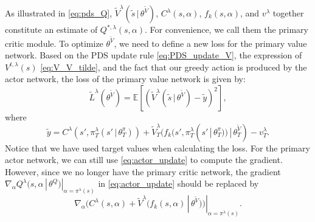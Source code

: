 \documentclass[lettersize, journal]{IEEEtran}
\begin{document}
As illustrated in \eqref{eq:pds_Q},
$\tilde{V}^{\lambda}(\tilde{s} \, | \, \theta^{\tilde{V}})$, $C^{\lambda}(s,\alpha)$, 
$f_k(s,\alpha)$, and $v^{\lambda}$ together constitute an estimate of $Q^{*,\lambda}(s,\alpha)$.
For convenience, we call them the primary critic module.
To optimize $\theta^{\tilde{V}}$, we need to define a new loss for the primary value network.
Based on the PDS update rule \eqref{eq:PDS_update_V}, the expression of $V^{t,\lambda}(s)$ \eqref{eq:V_V_tilde},
and the fact that our greedy action is produced by the actor network, the loss of the primary value network
is given by:
\begin{equation}
    \tilde{L}^{\lambda}(\theta^{\tilde{V}}) = \mathbb{E} \left[ \left( \tilde{V}^{\lambda}(\tilde{s} \, | \, \theta^{\tilde{V}})
    - \tilde{y} \right)^2\right],
    \label{eq:new_loss}
\end{equation}
where
\begin{equation*}
    \tilde{y} = C^{\lambda}(s', \pi^{\lambda}_T(s' \, | \, \theta^{\pi}_T)) 
    + \tilde{V}^{\lambda}_T(f_k(s', \pi^{\lambda}_T(s' \, | \, \theta^{\pi}_T)) \, | \, \theta^{\tilde{V}}_T) - v^{\lambda}_T.
\end{equation*}
Notice that we have used target values when calculating the loss.
For the primary actor network, we can still use \eqref{eq:actor_update} to compute the gradient.
However, since we no longer have the primary critic network,
the gradient $\nabla_{\alpha} Q^{\lambda}(s, \alpha \, | \, \theta^Q)|_{\alpha=\pi^{\lambda}(s)}$ in \eqref{eq:actor_update}
should be replaced by 
\begin{equation}
    \nabla_{\alpha} ( C^{\lambda}(s, \alpha) + \tilde{V}^{\lambda}(f_k(s,\alpha) \, | \, \theta^{\tilde{V}}) )|_{\alpha=\pi^{\lambda}(s)}.
    \label{eq:new_gradient}
\end{equation}
\end{document}
